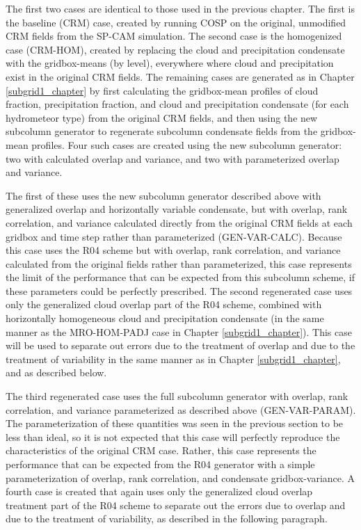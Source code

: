 The first two cases are identical to those used in the previous chapter. The first is the baseline (CRM) case, created by running COSP on the original, unmodified CRM fields from the SP-CAM simulation. The second case is the homogenized case (CRM-HOM), created by replacing the cloud and precipitation condensate with the gridbox-means (by level), everywhere where cloud and precipitation exist in the original CRM fields. The remaining cases are generated as in Chapter \ref{subgrid1_chapter} by first calculating the gridbox-mean profiles of cloud fraction, precipitation fraction, and cloud and precipitation condensate (for each hydrometeor type) from the original CRM fields, and then using the new subcolumn generator to regenerate subcolumn condensate fields from the gridbox-mean profiles. Four such cases are created using the new subcolumn generator: two with calculated overlap and variance, and two with parameterized overlap and variance. 

The first of these uses the new subcolumn generator described above with generalized overlap and horizontally variable condensate, but with overlap, rank correlation, and variance calculated directly from the original CRM fields at each gridbox and time step rather than parameterized (GEN-VAR-CALC). Because this case uses the R04 scheme but with overlap, rank correlation, and variance calculated from the original fields rather than parameterized, this case represents the limit of the performance that can be expected from this subcolumn scheme, if these parameters could be perfectly prescribed. The second regenerated case uses only the generalized cloud overlap part of the R04 scheme, combined with horizontally homogeneous cloud and precipitation condensate (in the same manner as the MRO-HOM-PADJ case in Chapter \ref{subgrid1_chapter}). This case will be used to separate out errors due to the treatment of overlap and due to the treatment of variability in the same manner as in Chapter \ref{subgrid1_chapter}, and as described below.

The third regenerated case uses the full subcolumn generator with overlap, rank correlation, and variance parameterized as described above (GEN-VAR-PARAM). The parameterization of these quantities was seen in the previous section to be less than ideal, so it is not expected that this case will perfectly reproduce the characteristics of the original CRM case. Rather, this case represents the performance that can be expected from the R04 generator with a simple parameterization of overlap, rank correlation, and condensate gridbox-variance. A fourth case is created that again uses only the generalized cloud overlap treatment part of the R04 scheme to separate out the errors due to overlap and due to the treatment of variability, as described in the following paragraph.

